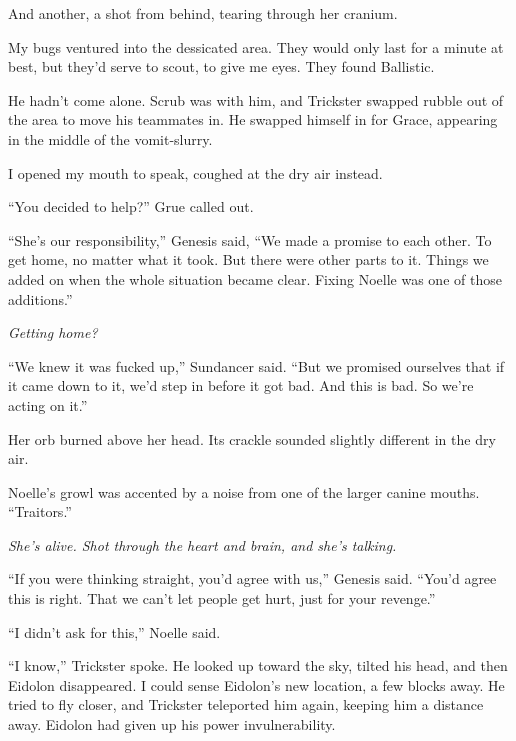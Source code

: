 And another, a shot from behind, tearing through her cranium.



My bugs ventured into the dessicated area.  They would only last for a minute at best, but they'd serve to scout, to give me eyes.  They found Ballistic.



He hadn't come alone.  Scrub was with him, and Trickster swapped rubble out of the area to move his teammates in.  He swapped himself in for Grace, appearing in the middle of the vomit-slurry.



I opened my mouth to speak, coughed at the dry air instead.



``You decided to help?'' Grue called out.



``She's our responsibility,'' Genesis said, ``We made a promise to each other.  To get home, no matter what it took.  But there were other parts to it.  Things we added on when the whole situation became clear.  Fixing Noelle was one of those additions.''



\emph{Getting home?}



``We knew it was fucked up,'' Sundancer said.  ``But we promised ourselves that if it came down to it, we'd step in before it got bad.  And this is bad.  So we're acting on it.''



Her orb burned above her head.  Its crackle sounded slightly different in the dry air.



Noelle's growl was accented by a noise from one of the larger canine mouths.  ``Traitors.''



\emph{She's alive.  Shot through the heart and brain, and she's talking.}



``If you were thinking straight, you'd agree with us,'' Genesis said.  ``You'd agree this is right.  That we can't let people get hurt, just for your revenge.''



``I didn't ask for this,'' Noelle said.



``I know,'' Trickster spoke.  He looked up toward the sky, tilted his head, and then Eidolon disappeared.  I could sense Eidolon's new location, a few blocks away.  He tried to fly closer, and Trickster teleported him again, keeping him a distance away.  Eidolon had given up his power invulnerability.



